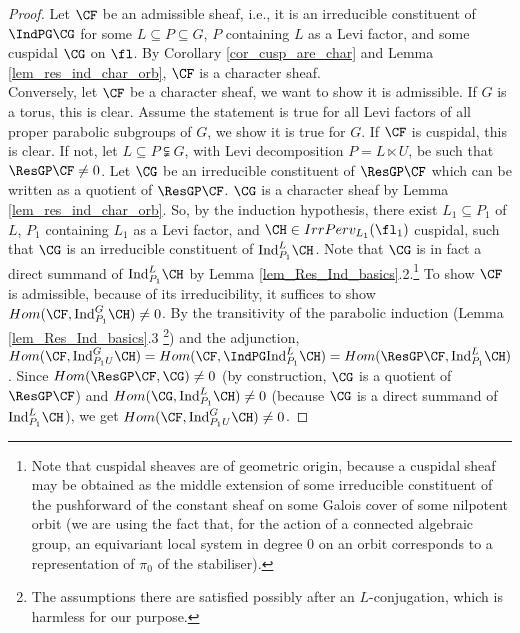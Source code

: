 \begin{proof}
    Let $\CF$ be an admissible sheaf, i.e., it is an irreducible constituent of $\IndPG\CG$ for some $L\subseteq P\subseteq G$, $P$ containing $L$ as a Levi factor, and some cuspidal $\CG$ on $\fl$. By Corollary \ref{cor_cusp_are_char} and Lemma \ref{lem_res_ind_char_orb}, $\CF$ is a character sheaf.\\

    Conversely, let $\CF$ be a character sheaf, we want to show it is admissible. If $G$ is a torus, this is clear. Assume the statement is true for all Levi factors of all proper parabolic subgroups of $G$, we show it is true for $G$. If $\CF$ is cuspidal, this is clear. If not, let $L\subseteq P\subsetneqq G$, with Levi decomposition $P=L\ltimes U$, be such that $\ResGP\CF\neq 0$. Let $\CG$ be an irreducible constituent of $\ResGP\CF$ which can be written as a quotient of $\ResGP\CF$. $\CG$ is a character sheaf by Lemma \ref{lem_res_ind_char_orb}. So, by the induction hypothesis, there exist $L_1\subseteq P_1$ of $L$, $P_1$ containing $L_1$ as a Levi factor, and $\CH\in IrrPerv_{L_1}(\fl_1)$ cuspidal, such that $\CG$ is an irreducible constituent of $\mathrm{Ind}^L_{P_1}\CH$. Note that $\CG$ is in fact a direct summand of $\mathrm{Ind}^L_{P_1}\CH$ by Lemma \ref{lem_Res_Ind_basics}.2.\footnote{Note that cuspidal sheaves are of geometric origin, because a cuspidal sheaf may be obtained as the middle extension of some irreducible constituent of the pushforward of the constant sheaf on some Galois cover of some nilpotent orbit (we are using the fact that, for the action of a connected algebraic group, an equivariant local system in degree 0 on an orbit corresponds to a representation of $\pi_0$ of the stabiliser).} To show $\CF$ is admissible, because of its irreducibility, it suffices to show $Hom(\CF, \mathrm{Ind}^G_{P_1}\CH)\neq 0$. By the transitivity of the parabolic induction (Lemma \ref{lem_Res_Ind_basics}.3 \footnote{The assumptions there are satisfied possibly after an $L$-conjugation, which is harmless for our purpose.}) and the adjunction, $Hom(\CF, \mathrm{Ind}^G_{P_1U}\CH)=Hom(\CF, \IndPG\mathrm{Ind}^L_{P_1}\CH)=Hom(\ResGP\CF, \mathrm{Ind}^L_{P_1}\CH)$. Since $Hom(\ResGP\CF, \CG)\neq 0$ (by construction, $\CG$ is a quotient of $\ResGP\CF$) and $Hom(\CG, \mathrm{Ind}^L_{P_1}\CH)\neq 0$ (because $\CG$ is a direct summand of $\mathrm{Ind}^L_{P_1}\CH$), we get $Hom(\CF, \mathrm{Ind}^G_{P_1U}\CH)\neq 0$.

\end{proof}

